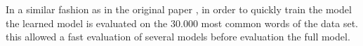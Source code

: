 In a similar fashion as in the original paper
\cite{DBLP:journals/corr/abs-1301-3781},  in order to quickly train the model
the  learned model is evaluated on  the 30.000 most common words of the
data set. this allowed a fast  evaluation of several models before evaluation
the full model.






